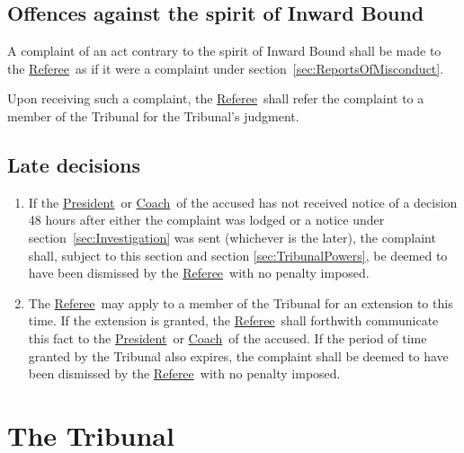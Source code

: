 \documentclass[12pt]{report}
\newcommand{\hyplink}[1]{\hyperlink{#1}{{#1}}}
\newcommand{\Captain}{\hyplink{Coach}}
\newcommand\President{\hyplink{President}}\newcommand\xPresident{President}
\newcommand{\Referee}{\hyplink{Referee}}
\begin{document}
  \section{Offences against the spirit of Inward Bound}
  \begin{fenumerate}
    \item A complaint of an act contrary to the spirit of Inward Bound shall be made to the \Referee\ as if it were a complaint under section~\ref{sec:ReportsOfMisconduct}.
    \item Upon receiving such a complaint, the \Referee\ shall refer the complaint to a member of the Tribunal for the Tribunal's judgment.
  \end{fenumerate}
  \section{Late decisions}\label{sec:LateDecisions}
  \begin{enumerate}
    \item If the \President\ or \Captain\ of the accused has not received notice of a decision 48 hours after either the complaint was lodged or a notice under section~\ref{sec:Investigation} was sent (whichever is the later), the complaint shall, subject to this section and section \ref{sec:TribunalPowers}, be deemed to have been dismissed by the \Referee\ with no penalty imposed.
    \item The \Referee\ may apply to a member of the Tribunal for an extension to this time. If the extension is granted, the \Referee\ shall forthwith communicate this fact to the \President\ or \Captain\ of the accused. If the period of time granted by the Tribunal also expires, the complaint shall be deemed to have been dismissed by the \Referee\ with no penalty imposed.
  \end{enumerate}

  \chapter{The Tribunal}
\end{document}
